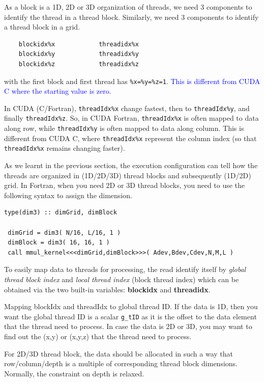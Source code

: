 As a block is a 1D, 2D or 3D organization of threads, we need 3
components to identify the thread in a thread block. Similarly, we
need 3 components to identify a thread block in a grid.
\begin{verbatim}
    blockidx%x            threadidx%x
    blockidx%y            threadidx%y
    blockidx%z            threadidx%z
\end{verbatim}
with the first block and first thread has
\verb!%x=%y=%z=1!. \textcolor{blue}{This is
different from CUDA C where the starting value is zero}.

\begin{framed}
  In CUDA (C/Fortran), \verb!threadIdx%x! change fastest, then to
  \verb!threadIdx%y!, and finally
  \verb!threadIdx%z!. So, in CUDA Fortran,
  \verb!threadIdx%x! is often mapped to data along row, while
  \verb!threadIdx%y! is often mapped to data along column. This
  is different from CUDA C, where \verb!threadIdx%x! represent the
  column index (so that \verb!threadIdx%x! remains changing faster).
\end{framed}

As we learnt in the previous section, the execution configuration can
tell how the threads are organized in (1D/2D/3D) thread blocks and
subsequently (1D/2D) grid. In Fortran, when you need 2D or 3D thread
blocks, you need to use the following syntax to assign the dimension.
\begin{lstlisting}
type(dim3) :: dimGrid, dimBlock

 dimGrid = dim3( N/16, L/16, 1 )
 dimBlock = dim3( 16, 16, 1 )
 call mmul_kernel<<<dimGrid,dimBlock>>>( Adev,Bdev,Cdev,N,M,L )

\end{lstlisting}

To easily map data to threads for processing, the read identify itself
by {\it global thread block index} and {\it local thread index} (block
thread index) which can be obtained via the two built-in variables:
{\bf blockidx} and {\bf threadidx}.

Mapping blockIdx and threadIdx to global thread ID. If the data is 1D,
then you want the global thread ID is a scalar \verb!g_tID! as it is
the offset to the data element that the thread need to process. In
case the data is 2D or 3D, you may want to find out the (x,y) or
(x,y,z) that the thread need to process. 

\begin{framed}
  For 2D/3D thread block, the data should be allocated in such a way
  that row/column/depth is a multiple of corresponding thread block
  dimensions. Normally, the constraint on depth is relaxed.
\end{framed}

